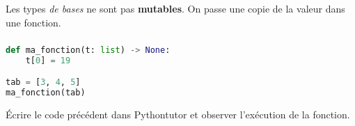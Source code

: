 \documentclass[svgnames,11pt]{beamer}
\begin{document}
\begin{frame}
    \frametitle{}

    \begin{center}
    \end{center}

\end{frame}
\begin{frame}
    \frametitle{}

    \begin{aretenir}[]
        Les types \emph{de bases} ne sont pas \textbf{mutables}. On passe une copie de la valeur dans une fonction.
    \end{aretenir}

\end{frame}
\begin{frame}[fragile]
    \frametitle{}

    \begin{lstlisting}[language=Python , basicstyle=\ttfamily\small, xleftmargin=2em, xrightmargin=2em]
def ma_fonction(t: list) -> None:
    t[0] = 19

tab = [3, 4, 5]
ma_fonction(tab)
\end{lstlisting}
    \begin{activite}
        Écrire le code précédent dans Pythontutor et observer l'exécution de la fonction.
    \end{activite}
\end{frame}
\end{document}
